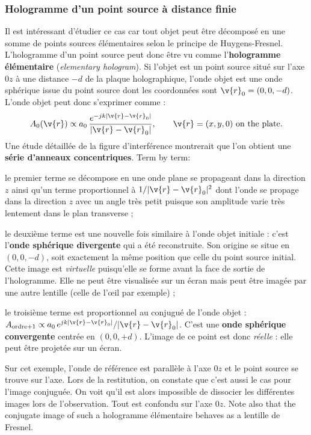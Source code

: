 \subsubsection{Hologramme d'un point source à distance finie}
Il est intéressant d'étudier ce cas car tout objet peut être décomposé en une
somme de points sources élémentaires selon le principe de Huygens-Fresnel.
L'hologramme d'un point source peut donc être vu comme l'\textbf{hologramme
élémentaire} (\textit{elementary hologram}). Si l'objet est un point source
situé sur l'axe $0z$ à une distance $-d$ de la plaque holographique, l'onde objet
est une onde sphérique issue du point source dont les coordonnées sont
$\v{r}_0=(0,0,-d)$. L'onde objet peut donc s'exprimer comme :
\begin{equation*}
  A_0(\v{r}) \propto a_0\,\frac{e^{-jk|\v{r}-\v{r}_0|}}{|\v{r}-\v{r}_0|},
  \qquad \v{r}=(x,y,0)\ \text{on the plate}.
\end{equation*}
Une étude détaillée de la figure d'interférence montrerait que l'on obtient une
\textbf{série d'anneaux concentriques}. Term by term:

\begin{subpart}
  \item le premier terme se décompose en une onde plane se propageant dans la
    direction $z$ ainsi qu'un terme proportionnel à $1/|\v{r}-\v{r}_0|^2$ dont
    l'onde se propage dans la direction $z$ avec un angle très petit puisque son
    amplitude varie très lentement dans le plan transverse ;
  \item le deuxième terme est une nouvelle fois similaire à l'onde objet
    initiale : c'est l'\textbf{onde sphérique divergente} qui a été reconstruite.
    Son origine se situe en $(0,0,-d)$, soit exactement la même position que
    celle du point source initial. Cette image est \emph{virtuelle} puisqu'elle
    se forme avant la face de sortie de l'hologramme. Elle ne peut être
    visualisée sur un écran mais peut être imagée par une autre lentille (celle
    de l'œil par exemple) ;
  \item le troisième terme est proportionnel au conjugué de l'onde objet :
    $A_{\text{ordre}+1} \propto a_0\,e^{jk|\v{r}-\v{r}_0|}/|\v{r}-\v{r}_0|$.
    C'est une \textbf{onde sphérique convergente} centrée en $(0,0,+d)$. L'image
    de ce point est donc \emph{réelle} : elle peut être projetée sur un écran.
\end{subpart}

\begin{remark}
  Sur cet exemple, l'onde de référence est parallèle à l'axe $0z$ et le point
  source se trouve sur l'axe. Lors de la restitution, on constate que c'est aussi
  le cas pour l'image conjuguée. On voit qu'il est alors impossible de dissocier
  les différentes images lors de l'observation. Tout est confondu sur l'axe
  $0z$. Note also that the conjugate image of such a hologramme élémentaire
  behaves as a lentille de Fresnel.
\end{remark}

